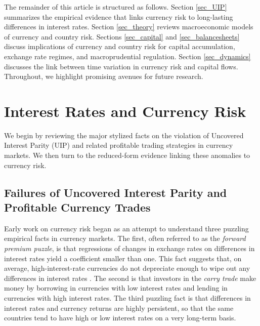 \documentclass[11pt]{article}
\begin{document}
The remainder of this article is structured as follows. Section \ref{sec_UIP} summarizes the empirical evidence that links currency risk to long-lasting differences in interest rates. Section \ref{sec_theory} reviews macroeconomic models of currency and country risk. Sections \ref{sec_capital} and \ref{sec_balancesheets} discuss implications of currency and country risk for capital accumulation, exchange rate regimes, and macroprudential regulation.  Section \ref{sec_dynamics} discusses the link between time variation in currency risk and capital flows. Throughout, we highlight promising avenues for future research.


\section{Interest Rates and Currency Risk \label{sec_UIP}}

We begin by reviewing the major stylized facts on the violation of Uncovered Interest Parity (UIP) and related profitable trading strategies in currency markets. We then turn to the reduced-form evidence linking these anomalies to currency risk. 

\subsection{Failures of
  Uncovered Interest Parity and Profitable Currency Trades }

Early work on currency risk began as an attempt to understand three puzzling empirical facts in currency markets. The first, often referred to as the \textit{forward premium puzzle}, is that regressions of changes in exchange rates on differences in interest rates yield a coefficient smaller than one. This fact suggests that, on average, high-interest-rate currencies do not depreciate enough to wipe out any differences in interest rates \citep{Bilson1981, Fama1984}. The second is that investors in the \textit{carry trade} make money by borrowing in currencies with low interest rates and lending in currencies with high interest rates. The third puzzling fact is that differences in interest rates and currency returns are highly persistent, so that the same countries tend to have high or low interest rates on a very long-term basis.
\end{document}
